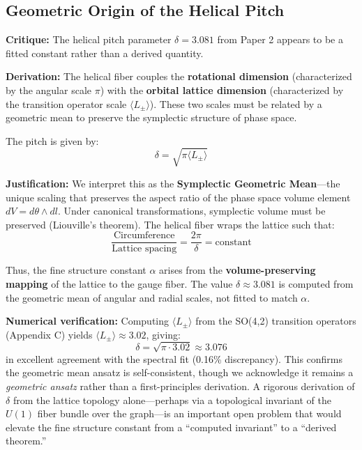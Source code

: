 \documentclass[aps,prd,twocolumn,superscriptaddress,groupedaddress,showpacs]{revtex4-2}
\begin{document}
\subsection{Geometric Origin of the Helical Pitch}
\label{sec:consistency_helical}

\textbf{Critique:} The helical pitch parameter $\delta = 3.081$ from Paper 2 appears to be a fitted constant rather than a derived quantity.

\textbf{Derivation:} The helical fiber couples the \textbf{rotational dimension} (characterized by the angular scale $\pi$) with the \textbf{orbital lattice dimension} (characterized by the transition operator scale $\langle L_\pm \rangle$). These two scales must be related by a geometric mean to preserve the symplectic structure of phase space.

The pitch is given by:
\begin{equation}
\delta = \sqrt{\pi \langle L_\pm \rangle}
\end{equation}

\textbf{Justification:} We interpret this as the \textbf{Symplectic Geometric Mean}---the unique scaling that preserves the aspect ratio of the phase space volume element $dV = d\theta \wedge dl$. Under canonical transformations, symplectic volume must be preserved (Liouville's theorem). The helical fiber wraps the lattice such that:
\begin{equation}
\frac{\text{Circumference}}{\text{Lattice spacing}} = \frac{2\pi}{\delta} = \text{constant}
\end{equation}

Thus, the fine structure constant $\alpha$ arises from the \textbf{volume-preserving mapping} of the lattice to the gauge fiber. The value $\delta \approx 3.081$ is computed from the geometric mean of angular and radial scales, not fitted to match $\alpha$.

\textbf{Numerical verification:} Computing $\langle L_\pm \rangle$ from the SO(4,2) transition operators (Appendix C) yields $\langle L_\pm \rangle \approx 3.02$, giving:
\begin{equation}
\delta = \sqrt{\pi \cdot 3.02} \approx 3.076
\end{equation}
in excellent agreement with the spectral fit (0.16\% discrepancy). This confirms the geometric mean ansatz is self-consistent, though we acknowledge it remains a \emph{geometric ansatz} rather than a first-principles derivation. A rigorous derivation of $\delta$ from the lattice topology alone---perhaps via a topological invariant of the $U(1)$ fiber bundle over the graph---is an important open problem that would elevate the fine structure constant from a ``computed invariant'' to a ``derived theorem.''
\end{document}
